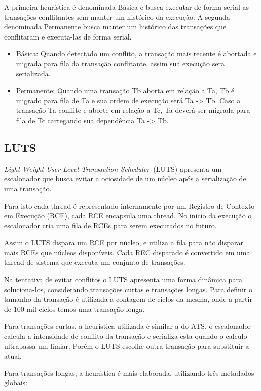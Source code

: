 \documentclass[diss,capa]{texufpel}
\begin{document}
A primeira heurística é denominada Básica e busca executar de forma serial as transações conflitantes sem manter um histórico da execução. A segunda denominada Permanente busca manter um histórico das transações que conflitaram e executa-las de forma serial.

\begin{itemize}
  \item Básica: Quando detectado um conflito, a transação mais recente é abortada e migrada para fila da transação conflitante, assim sua execução sera serializada.
  \item Permanente: Quando uma transação Tb aborta em relação a Ta, Tb é migrado para fila de Ta e sua ordem de execução será Ta -> Tb. Caso a transação Ta conflite e aborte em relação a Tc, Ta deverá ser migrada para fila de Tc carregando sua dependência Ta -> Tb.
\end{itemize}

\subsection{LUTS}

\emph{Light-Weight User-Level Transaction Scheduler}~(LUTS) apresenta um escalonador que busca evitar a ociosidade de um núcleo após a serialização de uma transação. 

Para isto cada thread é representado internamente por um Registro de Contexto em Execução (RCE), cada RCE encapsula uma thread. No inicio da execução o escalonador cria uma fila de RCEs para serem executados no futuro.

Assim o LUTS dispara um RCE por núcleo, e utiliza a fila para não disparar mais RCEs que núcleos disponíveis. Cada REC disparado é convertido em uma thread de sistema que executa um conjunto de transações.

Na tentativa de evitar conflitos o LUTS apresenta uma forma dinâmica para soluciona-los, considerando transações curtas e transações longas. Para definir o tamanho da transação é utilizada a contagem de ciclos da mesma, onde a partir de 100 mil ciclos temos uma transação longa.

Para transações curtas, a heurística utilizada é similar a do ATS, o escalonador calcula a intensidade de conflito da transação e serializa esta quando o calculo ultrapassa um limiar. Porém o LUTS escolhe outra transação para substituir a atual.

Para transações longas, a heurística é mais elaborada, utilizando três metadados globais:
\end{document}
